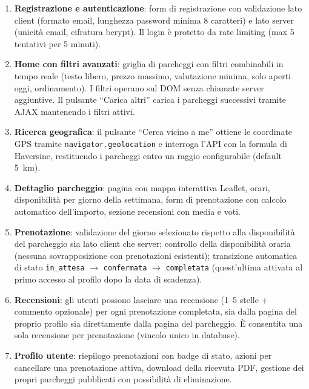 \documentclass[12pt, a4paper]{article}
\begin{document}
\begin{enumerate}[leftmargin=*, label=\textbf{\arabic*.}]
    \item \textbf{Registrazione e autenticazione}: form di registrazione con
    validazione lato client (formato email, lunghezza password minima 8 caratteri)
    e lato server (unicità email, cifratura bcrypt). Il login è protetto da
    rate limiting (max 5 tentativi per 5 minuti).

    \item \textbf{Home con filtri avanzati}: griglia di parcheggi con filtri
    combinabili in tempo reale (testo libero, prezzo massimo, valutazione minima,
    solo aperti oggi, ordinamento). I filtri operano sul DOM senza chiamate
    server aggiuntive. Il pulsante ``Carica altri'' carica i parcheggi
    successivi tramite AJAX mantenendo i filtri attivi.

    \item \textbf{Ricerca geografica}: il pulsante ``Cerca vicino a me'' ottiene
    le coordinate GPS tramite \texttt{navigator.geolocation} e interroga l'API
    con la formula di Haversine, restituendo i parcheggi entro un raggio
    configurabile (default 5~km).

    \item \textbf{Dettaglio parcheggio}: pagina con mappa interattiva Leaflet,
    orari, disponibilità per giorno della settimana, form di prenotazione con
    calcolo automatico dell'importo, sezione recensioni con media e voti.

    \item \textbf{Prenotazione}: validazione del giorno selezionato rispetto
    alla disponibilità del parcheggio sia lato client che server; controllo
    della disponibilità oraria (nessuna sovrapposizione con prenotazioni
    esistenti); transizione automatica di stato
    \texttt{in\_attesa} $\to$ \texttt{confermata} $\to$ \texttt{completata}
    (quest'ultima attivata al primo accesso al profilo dopo la data di scadenza).

    \item \textbf{Recensioni}: gli utenti possono lasciare una recensione
    (1--5 stelle + commento opzionale) per ogni prenotazione completata,
    sia dalla pagina del proprio profilo sia direttamente dalla pagina
    del parcheggio. È consentita una sola recensione per prenotazione
    (vincolo unico in database).

    \item \textbf{Profilo utente}: riepilogo prenotazioni con badge di stato,
    azioni per cancellare una prenotazione attiva, download della ricevuta PDF,
    gestione dei propri parcheggi pubblicati con possibilità di eliminazione.


\end{enumerate}
\end{document}
